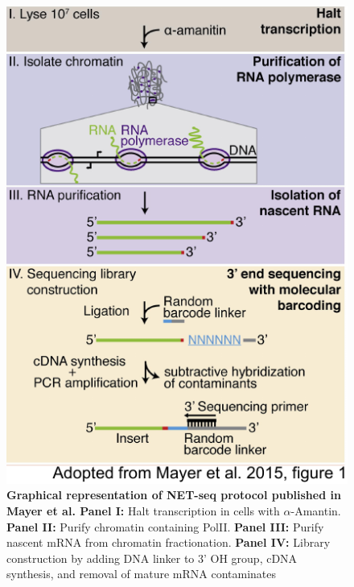 \begin{figure}
\centering \includegraphics[trim=0 .5in 0
  0,clip,width=5in]{img/ch04/Figure1.pdf}
\caption[Graphical representation of NET-seq protocol]{\textbf{ Graphical representation of NET-seq protocol published in Mayer et al. \citep{mayer_native_2015}}  {\bf Panel I:} Halt transcription in cells with $\alpha$-Amantin. {\bf Panel II:} Purify chromatin containing PolII. {\bf Panel III:}  Purify nascent mRNA from chromatin fractionation. {\bf Panel IV:}  Library construction by adding DNA linker to 3' OH group, cDNA synthesis, and removal of mature mRNA contaminates}
\label{fig:ch04-protocol}
\end{figure}


